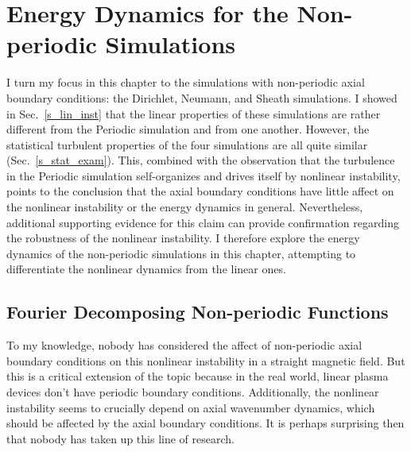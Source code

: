 \chapter{Energy Dynamics for the Non-periodic Simulations}
\label{c_nlin_nonper}

I turn my focus in this chapter to the simulations with non-periodic axial boundary conditions: the Dirichlet, Neumann, and Sheath simulations. I showed in Sec.~\ref{s_lin_inst}
that the linear properties of these simulations are rather different from the Periodic simulation and from one another. However, the statistical turbulent properties of the four simulations
are all quite similar (Sec.~\ref{s_stat_exam}). This, combined with the observation that the turbulence in the Periodic simulation self-organizes and drives itself by
nonlinear instability, points to the conclusion that the axial boundary conditions have little affect on the nonlinear instability or the energy dynamics in general. 
Nevertheless, additional supporting evidence for this claim can provide confirmation regarding the robustness of the nonlinear instability. I therefore explore the energy dynamics of the
non-periodic simulations in this chapter, attempting to differentiate the nonlinear dynamics from the linear ones.


\section{Fourier Decomposing Non-periodic Functions}
\label{s_fourier_decomp}

To my knowledge, nobody has considered the affect of non-periodic axial boundary conditions on this nonlinear instability in a straight magnetic field. But this is a critical extension of the topic
because in the real world, linear plasma devices don't have periodic boundary conditions. Additionally, the nonlinear instability seems to crucially depend on axial wavenumber dynamics, which should
be affected by the axial boundary conditions. It is perhaps surprising then that nobody has taken up this line of research.

